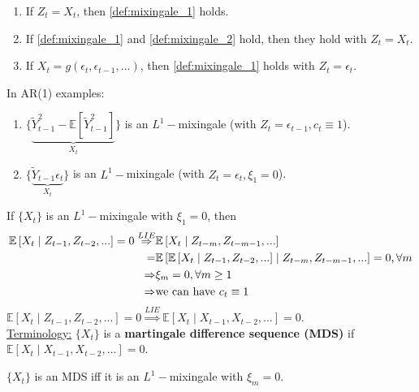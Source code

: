 \documentclass[11pt]{elegantbook}
\begin{document}
\begin{remark}
    \begin{enumerate}
        \item If $Z_t=X_t$, then \eqref{def:mixingale_1} holds.
        \item If \eqref{def:mixingale_1} and \eqref{def:mixingale_2} hold, then they hold with $Z_t=X_t$.
        \item If $X_t=g\left(\epsilon_t,\epsilon_{t-1},...\right)$, then \eqref{def:mixingale_1} holds with $Z_t=\epsilon_t$.
    \end{enumerate}
    In AR(1) examples:
    \begin{enumerate}
        \item $\{\underbrace{\tilde{Y}_{t-1}^2-\mathbb{E}[\tilde{Y}_{t-1}^2]}_{X_t}\}$ is an $L^1-$mixingale (with $Z_t=\epsilon_{t-1},c_t\equiv 1$).
        \item $\{\underbrace{\tilde{Y}_{t-1}\epsilon_t}_{X_t}\}$ is an $L^1-$mixingale (with $Z_t=\epsilon_t,\xi_1=0$).
    \end{enumerate}
    \begin{example}
        If $\{X_t\}$ is an $L^1-$mixingale with $\xi_1=0$, then
        \begin{equation}
            \begin{aligned}
                \mathbb{E}\left[X_t\mid Z_{t-1},Z_{t-2},...\right]=0 \stackrel{LIE}{\Rightarrow} &\mathbb{E}\left[X_t\mid Z_{t-m},Z_{t-m-1},...\right]\\
                =&\mathbb{E}\left[\mathbb{E}\left[X_t\mid Z_{t-1},Z_{t-2},...\right]\mid Z_{t-m},Z_{t-m-1},...\right]=0,\forall m\\
                \Rightarrow & \xi_m=0,\forall m\geq 1\\
                \Rightarrow &\textnormal{we can have } c_t\equiv 1
            \end{aligned}
            \nonumber
        \end{equation}
        $\mathbb{E}\left[X_t\mid Z_{t-1},Z_{t-2},...\right]=0 \stackrel{LIE}{\Rightarrow} \mathbb{E}\left[X_t\mid X_{t-1},X_{t-2},...\right]=0$.\\
        \underline{Terminology:} $\{X_t\}$ is a \textbf{martingale difference sequence (MDS)} if $\mathbb{E}\left[X_t\mid X_{t-1},X_{t-2},...\right]=0$.\\
        \begin{definition}
            $\{X_t\}$ is an MDS iff it is an $L^1-$mixingale with $\xi_m=0$.

\end{definition}
\end{example}
\end{remark}
\end{document}
